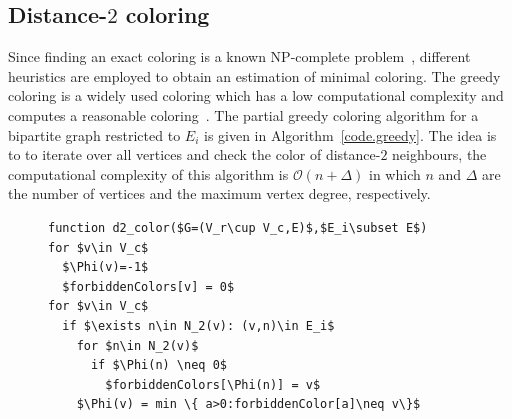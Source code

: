 \documentclass[11pt, twoside,a4paper]{book}
\newcommand{\coderef}[1]{Algorithm~\protect\ref{#1}}
\begin{document}
\subsection{Distance-$2$ coloring}
Since finding an exact coloring is a known NP-complete problem~\cite{SPINRAD198589},
different heuristics are employed to obtain an estimation of minimal coloring.
The greedy coloring is a widely used coloring which has a low computational complexity
and computes a reasonable coloring~\cite{spaa14}.
The partial greedy coloring algorithm for a bipartite graph restricted to $E_i$
is given in \coderef{code.greedy}. The idea is to to iterate over all vertices
and check the color of distance-$2$ neighbours, the computational complexity
of this algorithm is $\mathcal{O}(n + \Delta)$ in which $n$
and $\Delta$ are the number of vertices and the maximum vertex
degree, respectively.

\begin{figure}
\begin{lstlisting}[caption=The greedy algorithm for
the distance-$2$ coloring for columns in which $N_2(v)$ shows
the distance-$2$ neighbours of $v$.
,label=code.greedy,mathescape]
function d2_color($G=(V_r\cup V_c,E)$,$E_i\subset E$)
for $v\in V_c$
  $\Phi(v)=-1$
  $forbiddenColors[v] = 0$
for $v\in V_c$
  if $\exists n\in N_2(v): (v,n)\in E_i$
    for $n\in N_2(v)$
      if $\Phi(n) \neq 0$
        $forbiddenColors[\Phi(n)] = v$
    $\Phi(v) = min \{ a>0:forbiddenColor[a]\neq v\}$
\end{lstlisting}
\end{figure}
\end{document}
